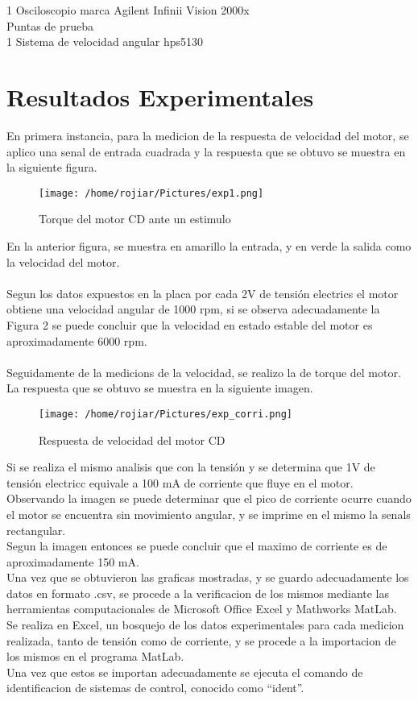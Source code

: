 \documentclass[a4paper,10pt,twocolumn]{article}
\begin{document}
1 Osciloscopio marca Agilent Infinii Vision 2000x
\\Puntas de prueba
\\1 Sistema de velocidad angular hps5130



\section{Resultados Experimentales}

En primera instancia, para la medicion de la respuesta de velocidad del motor, se aplico una senal de entrada cuadrada y la respuesta que se obtuvo 
se muestra en la siguiente figura.

\begin{figure}[h!]
\centering
\texttt{[image: /home/rojiar/Pictures/exp1.png]}
\caption{Torque del motor CD ante un estimulo}
\label{Torque del motor CD ante un estimulo}
\end{figure}

En la anterior figura, se muestra en amarillo la entrada, y en verde la salida como la velocidad del motor.
\\\\
Segun los datos expuestos en la placa por cada 2V de tensión electrics el motor obtiene una velocidad angular de 1000 rpm, si se observa
adecuadamente la Figura 2 se puede concluir que la velocidad en estado estable del motor es aproximadamente 6000 rpm.
\\\\
Seguidamente de la medicions de la velocidad, se realizo la de torque del motor. La respuesta que se obtuvo se muestra en la siguiente imagen.
\newpage

\begin{figure}[h]
\centering
\texttt{[image: /home/rojiar/Pictures/exp\_corri.png]}
\caption{Respuesta de velocidad del motor CD}
\label{Respuesta de velocidad del motor CD}
\end{figure}

Si se realiza el mismo analisis que con la tensión y se determina que 1V de tensión electricc equivale a 100 mA de corriente que fluye en el 
motor. Observando la imagen se puede determinar que el pico de corriente ocurre cuando el motor se encuentra sin movimiento angular, y se imprime
en el mismo la senals rectangular.\\

Segun la imagen entonces se puede concluir que el maximo de corriente es de aproximadamente 150 mA.\\

Una vez que se obtuvieron las graficas mostradas, y se guardo adecuadamente los datos en formato .csv, se procede a la verificacion de los mismos 
mediante las herramientas computacionales de Microsoft Office Excel y Mathworks MatLab.\\

Se realiza en Excel, un bosquejo de los datos experimentales para cada medicion realizada, tanto de tensión como de corriente, y se procede a 
la importacion de los mismos en el programa MatLab. \\
Una vez que estos se importan adecuadamente se ejecuta el comando de identificacion de sistemas de control, conocido como ``ident''. 
\end{document}
